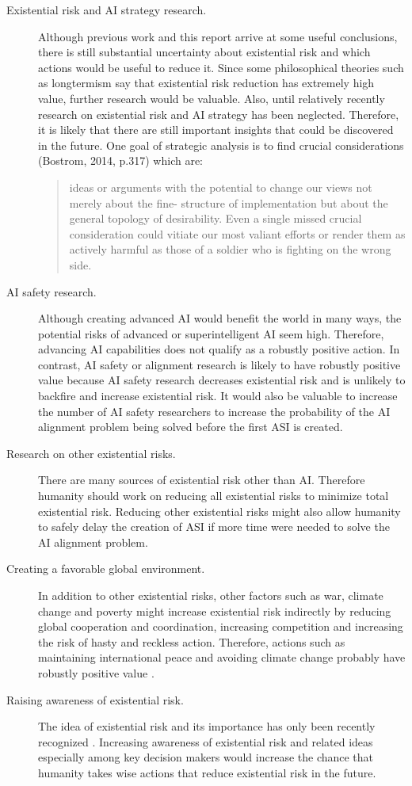 \documentclass{article}
\begin{document}
\begin{description}
    \item[Existential risk and AI strategy research.] Although previous work and this report arrive at some useful conclusions, there is still substantial uncertainty about existential risk and which actions would be useful to reduce it. Since some philosophical theories such as longtermism say that existential risk reduction has extremely high value, further research would be valuable. Also, until relatively recently research on existential risk and AI strategy has been neglected. Therefore, it is likely that there are still important insights that could be discovered in the future. One goal of strategic analysis is to find crucial considerations (Bostrom, 2014, p.317) which are:
        \begin{quote}
        ideas or arguments with the potential to change our views not merely about the fine-
        structure of implementation but about the general topology of desirability. Even
        a single missed crucial consideration could vitiate our most valiant efforts or render them as actively harmful as those of a soldier who is fighting on the wrong side.\cite{superintelligence}
        \end{quote}
    \item[AI safety research.] Although creating advanced AI would benefit the world in many ways, the potential risks of advanced or superintelligent AI seem high. Therefore, advancing AI capabilities does not qualify as a robustly positive action. In contrast, AI safety or alignment research is likely to have robustly positive value because AI safety research decreases existential risk and is unlikely to backfire and increase existential risk. It would also be valuable to increase the number of AI safety researchers to increase the probability of the AI alignment problem being solved before the first ASI is created.
    \item[Research on other existential risks.] There are many sources of existential risk other than AI. Therefore humanity should work on reducing all existential risks to minimize total existential risk. Reducing other existential risks might also allow humanity to safely delay the creation of ASI if more time were needed to solve the AI alignment problem.
    \item[Creating a favorable global environment.]  In addition to other existential risks, other factors such as war, climate change and poverty might increase existential risk indirectly by reducing global cooperation and coordination, increasing competition and increasing the risk of hasty and reckless action. Therefore, actions such as maintaining international peace and avoiding climate change probably have robustly positive value \cite{theprecipice}.
    \item[Raising awareness of existential risk.]  The idea of existential risk and its importance has only been recently recognized \cite{existentialriskhistory}. Increasing awareness of existential risk and related ideas especially among key decision makers would increase the chance that humanity takes wise actions that reduce existential risk in the future.
\end{description}
\end{document}
